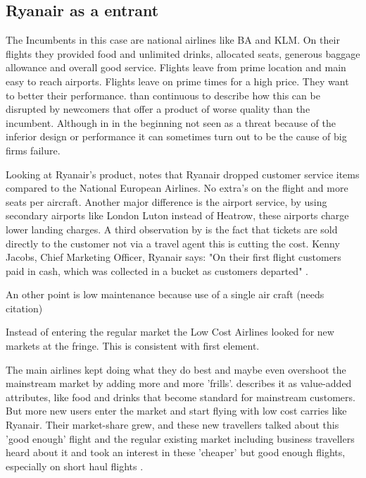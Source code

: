 \documentclass[a4paper, 11pt]{article}
\begin{document}
{{\subsection{Ryanair as a entrant}
\label{sec:this-is-a-section}


The Incumbents in this case are national airlines like BA and KLM. On their flights they provided food and unlimited drinks, allocated seats, generous baggage allowance and overall good service. Flights leave from prime location and main easy to reach airports. Flights leave on prime times for a high price. They want to better their performance. \cite{Christensen97} than continuous to describe how this can be disrupted by newcomers that offer a product of worse quality than the incumbent. Although in in the beginning not seen as a threat because of the inferior design or performance it can sometimes turn out to be the cause of big firms failure.

Looking at Ryanair's product, \cite{Barrett} notes that Ryanair dropped customer service items compared to the National European Airlines. No extra's on the flight and more seats per aircraft. Another major difference is the airport service, by using secondary airports like London Luton instead of Heatrow, these airports charge lower landing charges. A third observation by \cite{Barrett} is the fact that tickets are sold directly to the customer not via a travel agent this is cutting the cost. Kenny Jacobs, Chief Marketing Officer, Ryanair says: "On their first flight customers paid in cash, which was collected in a bucket as customers departed" \citep{ITBberlin}.

An other point is low maintenance because use of a single air craft (needs citation)

Instead of entering the regular market the Low Cost Airlines looked for new markets at the fringe. This is consistent with \cite{Christensen} first element.


The main airlines kept doing what they do best and maybe even overshoot the mainstream market by adding more and more 'frills'. \cite{Droege} describes it as value-added attributes, like food and drinks that become standard for mainstream customers. But more new users enter the market and start flying with low cost carries like Ryanair. Their market-share grew, and these new travellers talked about this 'good enough' flight and the regular existing market including business travellers heard about it and took an interest in these 'cheaper' but good enough flights, especially on short haul flights \citep{TiddBessant}.

}}
\end{document}
